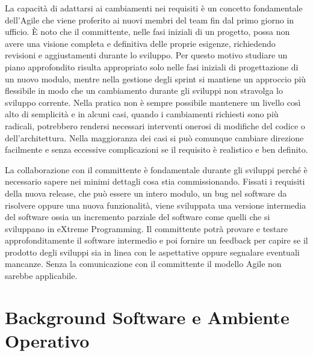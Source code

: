 \documentclass[target=bach,aauheader=,style=]{thud}
\begin{document}
La capacità di adattarsi ai cambiamenti nei requisiti è un concetto fondamentale dell'Agile che viene proferito ai nuovi membri del team fin dal primo giorno
in ufficio. È noto che il committente, nelle fasi iniziali di un progetto, possa non avere una visione completa e definitiva delle proprie esigenze, richiedendo revisioni e aggiustamenti
durante lo sviluppo. Per questo motivo studiare un piano approfondito risulta appropriato solo nelle fasi iniziali di progettazione di un nuovo modulo, mentre nella gestione degli sprint si mantiene
un approccio più flessibile in modo che un cambiamento durante gli sviluppi non stravolga lo sviluppo corrente. Nella pratica non è sempre possibile mantenere un livello così alto di semplicità
e in alcuni casi, quando i cambiamenti richiesti sono più radicali, potrebbero rendersi necessari interventi onerosi di modifiche del codice o dell'architettura.
Nella maggioranza dei casi si può comunque cambiare direzione facilmente e senza eccessive complicazioni se il requisito è realistico e ben definito.

La collaborazione con il committente è fondamentale durante gli sviluppi perché è necessario sapere nei minimi dettagli cosa stia commissionando.
Fissati i requisiti della nuova release, che può essere un intero modulo, un bug nel software da risolvere oppure una nuova funzionalità, viene sviluppata
una versione intermedia del software ossia un incremento parziale del software come quelli che si sviluppano in eXtreme Programming. Il committente potrà provare e
testare approfonditamente il software intermedio e poi fornire un feedback per capire se il prodotto degli sviluppi sia in linea con le aspettative oppure segnalare eventuali mancanze.
Senza la comunicazione con il committente il modello Agile non sarebbe applicabile.

\chapter{Background Software e Ambiente Operativo}
\end{document}
